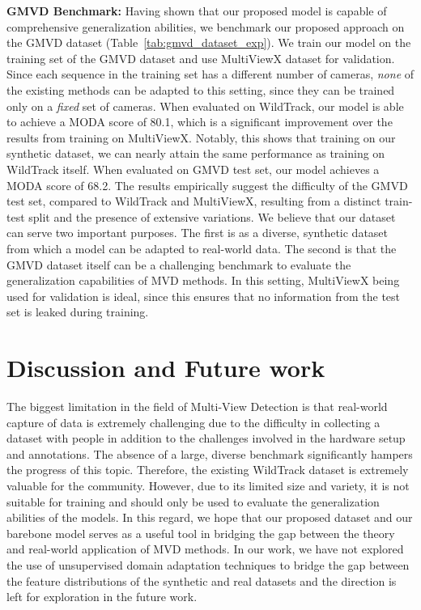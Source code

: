 \documentclass[letterpaper, 10 pt, conference]{ieeeconf}  \usepackage{times}
\begin{document}
\textbf{GMVD Benchmark:} Having shown that our proposed model is capable of comprehensive generalization abilities, we benchmark our proposed approach on the GMVD dataset (Table~\ref{tab:gmvd_dataset_exp}). We train our model on the training set of the GMVD dataset and use MultiViewX dataset for validation. Since each sequence in the training set has a different number of cameras, \emph{none} of the existing methods can be adapted to this setting, since they can be trained only on a \emph{fixed} set of cameras. 
When evaluated on WildTrack, our model is able to achieve a MODA score of 80.1, which is a significant improvement over the results from training on MultiViewX. Notably, this shows that training on our synthetic dataset, we can nearly attain the same performance as training on WildTrack itself. When evaluated on GMVD test set, our model achieves a MODA score of 68.2. The results empirically suggest the difficulty of the GMVD test set, compared to WildTrack and MultiViewX, resulting from a distinct train-test split and the presence of extensive variations. We believe that our dataset can serve two important purposes. The first is as a diverse, synthetic dataset from which a model can be adapted to real-world data. The second is that the GMVD dataset itself can be a challenging benchmark to evaluate the generalization capabilities of MVD methods. In this setting, MultiViewX being used for validation is ideal, since this ensures that no information from the test set is leaked during training. 

\section{Discussion and Future work}
The biggest limitation in the field of Multi-View Detection is that real-world capture of data is extremely challenging due to the difficulty in collecting a dataset with people in addition to the challenges involved in the hardware setup and annotations. The absence of a large, diverse benchmark significantly hampers the progress of this topic. Therefore, the existing WildTrack dataset is extremely valuable for the community. However, due to its limited size and variety, it is not suitable for training and should only be used to evaluate the generalization abilities of the models. In this regard, we hope that our proposed dataset and our barebone model serves as a useful tool in bridging the gap between the theory and real-world application of MVD methods. In our work, we have not explored the use of unsupervised domain adaptation techniques to bridge the gap between the feature distributions of the synthetic and real datasets and the direction is left for exploration in the future work.
\end{document}
